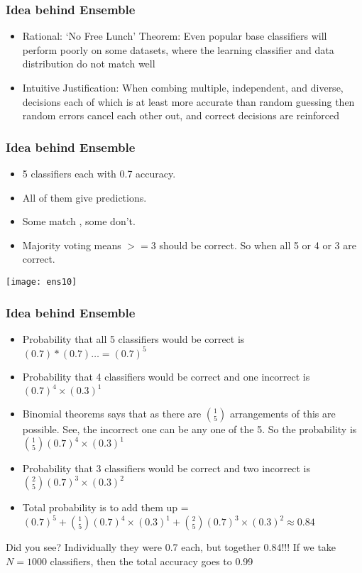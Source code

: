 \begin{frame}[fragile]\frametitle{Idea behind Ensemble}
\begin{itemize}
\item Rational: `No Free Lunch' Theorem: Even popular base classifiers will perform poorly on some datasets, where the learning classifier and data distribution do not match well
\item Intuitive Justification: When combing multiple, independent, and diverse, decisions each of
which is at least more accurate than random guessing then random errors cancel each other out, and correct decisions are reinforced
\end{itemize}
\end{frame}

\begin{frame}[fragile]\frametitle{Idea behind Ensemble}
\begin{itemize}
\item 5 classifiers each with 0.7 accuracy. 
\item All of them give predictions. 
\item Some match , some don't.
\item Majority voting means $>= 3$ should be correct. So when all 5 or 4 or 3 are correct.
\end{itemize}

\begin{center}
\texttt{[image: ens10]}
\end{center}


\end{frame}

\begin{frame}[fragile]\frametitle{Idea behind Ensemble}
\begin{itemize}
\item Probability that all 5 classifiers would be correct is $ (0.7) * (0.7) \ldots = (0.7)^5$

\item Probability that 4 classifiers would be correct and one incorrect is $(0.7)^4  \times (0.3)^1$
\item Binomial theorems says that as there are ${1 \choose 5}$ arrangements of this are possible. See, the incorrect one can be any one of the 5. So the probability is ${1 \choose 5} (0.7)^4  \times (0.3)^1$
\item Probability that 3 classifiers would be correct and two incorrect is ${2 \choose 5}  (0.7)^3 \times (0.3)^2$

\item Total probability is to add them up = $(0.7)^5 + {1 \choose 5} (0.7)^4  \times (0.3)^1 + {2 \choose 5} (0.7)^3 \times (0.3)^2 \approx 0.84$
\end{itemize}
Did you see? Individually they were 0.7 each, but together 0.84!!! If we take $N = 1000$ classifiers, then the total accuracy goes to 0.99
\end{frame}




